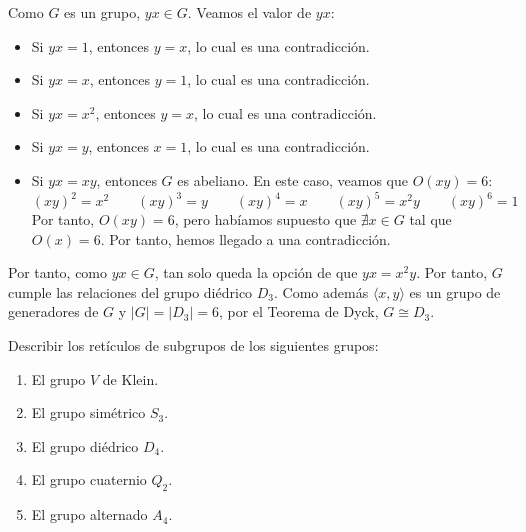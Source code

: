 \begin{ejercicio}
\begin{enumerate}
\begin{itemize}
\begin{itemize}
                Como $G$ es un grupo, $yx\in G$. Veamos el valor de $yx$:
                \begin{itemize}
                    \item Si $yx=1$, entonces $y=x$, lo cual es una contradicción.
                    \item Si $yx=x$, entonces $y=1$, lo cual es una contradicción.
                    \item Si $yx=x^2$, entonces $y=x$, lo cual es una contradicción.
                    \item Si $yx=y$, entonces $x=1$, lo cual es una contradicción.
                    \item Si $yx=xy$, entonces $G$ es abeliano. En este caso, veamos que $O(xy)=6$:
                    \begin{equation*}
                        (xy)^2=x^2\qquad 
                        (xy)^3=y\qquad 
                        (xy)^4=x\qquad 
                        (xy)^5=x^2y\qquad 
                        (xy)^6=1
                    \end{equation*}
                    Por tanto, $O(xy)=6$, pero habíamos supuesto que $\nexists x\in G$ tal que $O(x)=6$. Por tanto, hemos llegado a una contradicción.
                \end{itemize}

                Por tanto, como $yx\in G$, tan solo queda la opción de que $yx=x^2y$. Por tanto, $G$ cumple las relaciones del grupo diédrico $D_3$. Como además $\langle x,y\rangle$ es un grupo de generadores de $G$ y $|G|=|D_3|=6$, por el Teorema de Dyck, $G\cong D_3$.
            \end{itemize}

        \end{itemize}
    \end{enumerate}
\end{ejercicio}

\begin{ejercicio}\label{ej:3.11}
    Describir los retículos de subgrupos de los siguientes grupos:
    \begin{enumerate}
        \item El grupo $V$ de Klein.
        \item El grupo simétrico $S_3$.
        \item El grupo diédrico $D_4$.
        \item El grupo cuaternio $Q_2$.
        \item El grupo alternado $A_4$.
    \end{enumerate}

\end{ejercicio}


